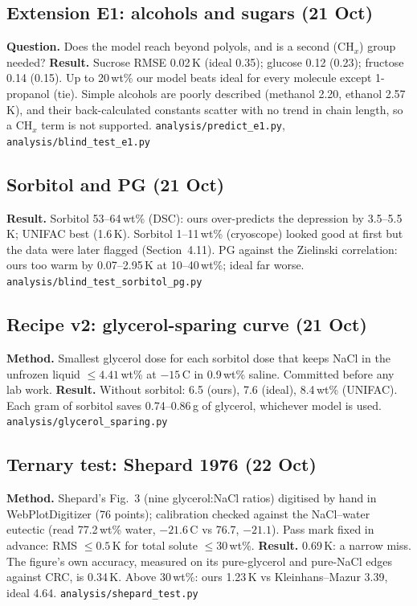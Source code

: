 \documentclass[11pt,a4paper]{article}
\newcommand{\file}[1]{\texttt{\small #1}}
\begin{document}
\subsection{Extension E1: alcohols and sugars (21 Oct)}
\textbf{Question.} Does the model reach beyond polyols, and is a second (CH$_x$) group needed?
\textbf{Result.} Sucrose RMSE 0.02\,K (ideal 0.35); glucose 0.12 (0.23); fructose 0.14 (0.15). Up to 20\,wt\% our model
beats ideal for every molecule except 1-propanol (tie). Simple alcohols are poorly described (methanol 2.20, ethanol
2.57\,K), and their back-calculated constants scatter with no trend in chain length, so a CH$_x$ term is not
supported. \file{analysis/predict\_e1.py}, \file{analysis/blind\_test\_e1.py}

\subsection{Sorbitol and PG (21 Oct)}
\textbf{Result.} Sorbitol 53--64\,wt\% (DSC): ours over-predicts the depression by 3.5--5.5\,K; UNIFAC best (1.6\,K).
Sorbitol 1--11\,wt\% (cryoscope) looked good at first but the data were later flagged (Section~4.11). PG against the
Zielinski correlation: ours too warm by 0.07--2.95\,K at 10--40\,wt\%; ideal far worse.
\file{analysis/blind\_test\_sorbitol\_pg.py}

\subsection{Recipe v2: glycerol-sparing curve (21 Oct)}
\textbf{Method.} Smallest glycerol dose for each sorbitol dose that keeps NaCl in the unfrozen liquid $\le4.41$\,wt\% at
$-15$\,\textdegree C in 0.9\,wt\% saline. Committed before any lab work.
\textbf{Result.} Without sorbitol: 6.5 (ours), 7.6 (ideal), 8.4\,wt\% (UNIFAC). Each gram of sorbitol saves
0.74--0.86\,g of glycerol, whichever model is used. \file{analysis/glycerol\_sparing.py}

\subsection{Ternary test: Shepard 1976 (22 Oct)}
\textbf{Method.} Shepard's Fig.~3 (nine glycerol:NaCl ratios) digitised by hand in WebPlotDigitizer (76 points);
calibration checked against the NaCl--water eutectic (read 77.2\,wt\% water, $-21.6$\,\textdegree C vs 76.7,
$-21.1$). Pass mark fixed in advance: RMS $\le0.5$\,K for total solute $\le30$\,wt\%.
\textbf{Result.} 0.69\,K: a narrow miss. The figure's own accuracy, measured on its pure-glycerol and pure-NaCl
edges against CRC, is 0.34\,K. Above 30\,wt\%: ours 1.23\,K vs Kleinhans--Mazur 3.39, ideal 4.64.
\file{analysis/shepard\_test.py}
\end{document}
